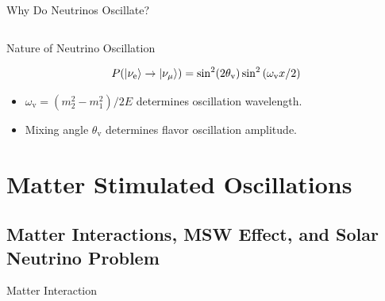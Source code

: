 \documentclass[9pt]{beamer}
\begin{document}
\begin{darkframes}
\begin{frame}[fragile]{Why Do Neutrinos Oscillate?}
\begin{tcolorbox}[title=Hamiltonian $\mathbf H$]
\begin{columns}[T]
\begin{column}{.59\textwidth}
\end{column}%
\end{columns}

\end{tcolorbox}



\end{frame}





\begin{frame}[fragile]{Nature of Neutrino Oscillation}



\begin{tcolorbox}[title=Transition Probability]

\begin{equation*}
P(\left| \nu_{\mathrm e} \right\rangle\to\left| \nu_{\mu}\right\rangle)  =  \sin^2(2\theta_{\mathrm v}) \sin^2 \left( \omega_{\mathrm v} x/2 \right)
\end{equation*}

\end{tcolorbox}

\begin{itemize}
    \item $\omega_{\mathrm v}=(m_2^2-m_1^2)/2E$ determines oscillation wavelength.
    \item Mixing angle $\theta_{\mathrm v}$ determines flavor oscillation amplitude.
\end{itemize}



\end{frame}






\section{Matter Stimulated Oscillations}


\subsection{Matter Interactions, MSW Effect, and Solar Neutrino Problem}


\begin{frame}{Matter Interaction}




\end{frame}
\end{darkframes}
\end{document}

